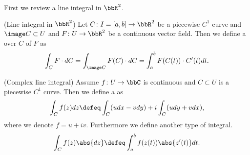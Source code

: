 \documentclass[openany, a4paper, oneside]{jsbook}
\begin{document}
First we review a line integral in $\bbR^2$.
\begin{defn}\textup{(Line integral in $\bbR^2$)}
 Let $C \colon I=[a,b] \to \bbR^2$ be a piecewise $C^1$ curve and $\image C \subset U$ and
 $F \colon U \to \bbR^2$ be a continuous vector field.
 Then we define a  over $C$ of $F$ as
\begin{align}
 \int_{C} F \cdot dC
 =
 \int_{\image C} F (C) \cdot dC
 =
 \int_a^b F (C (t)) \cdot C'(t) dt.
\end{align}
\end{defn}
\begin{defn}\textup{(Complex line integral)}
 Assume $f \colon U \to \bbC$ is continuous and $C \subset U$ is a piecewise $C^1$ curve.
 Then we define a  as
\begin{align}
 \int_C f (z) dz
 \defeq
 \int_C (u dx - v dy) + i \int_C (u dy + v dx),
\end{align}
where we denote $f = u + iv$.
Furthermore we define another type of integral.
\begin{align}
 \int_C f (z) \abs{dz}
 \defeq
 \int_a^b f (z (t)) \abs{z'(t)} dt.
\end{align}
\end{defn}
\end{document}
